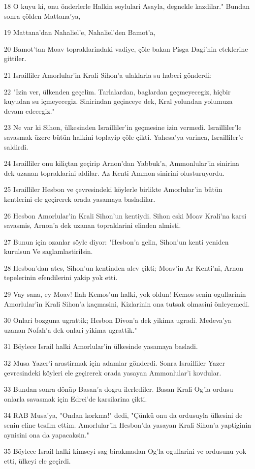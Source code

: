 \par 18 O kuyu ki, onu önderlerle Halkin soylulari Asayla, degnekle kazdilar." Bundan sonra çölden Mattana'ya,
\par 19 Mattana'dan Nahaliel'e, Nahaliel'den Bamot'a,
\par 20 Bamot'tan Moav topraklarindaki vadiye, çöle bakan Pisga Dagi'nin eteklerine gittiler.
\par 21 Israilliler Amorlular'in Krali Sihon'a ulaklarla su haberi gönderdi:
\par 22 "Izin ver, ülkenden geçelim. Tarlalardan, baglardan geçmeyecegiz, hiçbir kuyudan su içmeyecegiz. Sinirindan geçinceye dek, Kral yolundan yolumuza devam edecegiz."
\par 23 Ne var ki Sihon, ülkesinden Israilliler'in geçmesine izin vermedi. Israilliler'le savasmak üzere bütün halkini toplayip çöle çikti. Yahesa'ya varinca, Israilliler'e saldirdi.
\par 24 Israilliler onu kiliçtan geçirip Arnon'dan Yabbuk'a, Ammonlular'in sinirina dek uzanan topraklarini aldilar. Az Kenti Ammon sinirini olusturuyordu.
\par 25 Israilliler Hesbon ve çevresindeki köylerle birlikte Amorlular'in bütün kentlerini ele geçirerek orada yasamaya basladilar.
\par 26 Hesbon Amorlular'in Krali Sihon'un kentiydi. Sihon eski Moav Krali'na karsi savasmis, Arnon'a dek uzanan topraklarini elinden almisti.
\par 27 Bunun için ozanlar söyle diyor: "Hesbon'a gelin, Sihon'un kenti yeniden kurulsun Ve saglamlastirilsin.
\par 28 Hesbon'dan ates, Sihon'un kentinden alev çikti; Moav'in Ar Kenti'ni, Arnon tepelerinin efendilerini yakip yok etti.
\par 29 Vay sana, ey Moav! Ilah Kemos'un halki, yok oldun! Kemos senin ogullarinin Amorlular'in Krali Sihon'a kaçmasini, Kizlarinin ona tutsak olmasini önleyemedi.
\par 30 Onlari bozguna ugrattik; Hesbon Divon'a dek yikima ugradi. Medeva'ya uzanan Nofah'a dek onlari yikima ugrattik."
\par 31 Böylece Israil halki Amorlular'in ülkesinde yasamaya basladi.
\par 32 Musa Yazer'i arastirmak için adamlar gönderdi. Sonra Israilliler Yazer çevresindeki köyleri ele geçirerek orada yasayan Ammonlular'i kovdular.
\par 33 Bundan sonra dönüp Basan'a dogru ilerlediler. Basan Krali Og'la ordusu onlarla savasmak için Edrei'de karsilarina çikti.
\par 34 RAB Musa'ya, "Ondan korkma!" dedi, "Çünkü onu da ordusuyla ülkesini de senin eline teslim ettim. Amorlular'in Hesbon'da yasayan Krali Sihon'a yaptiginin aynisini ona da yapacaksin."
\par 35 Böylece Israil halki kimseyi sag birakmadan Og'la ogullarini ve ordusunu yok etti, ülkeyi ele geçirdi.

